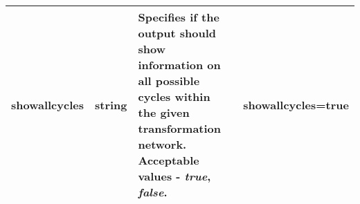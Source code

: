\documentclass[11pt,letterpaper,titlepage]{article}
\begin{document}
\begin{footnotesize}
\begin{landscape}
\begin{center}
\begin{longtable}[1]{p{3cm}|p{0.5cm}|p{11cm}|p{4cm}}
\hline
showallcycles      & string          & Specifies if the output should show information on all possible cycles within the given transformation network. Acceptable values - \textit{true}, \textit{false}. & showallcycles=true  \\
\hline
\end{longtable}
\end{center}
\end{landscape}
\end{footnotesize}
\end{document}

